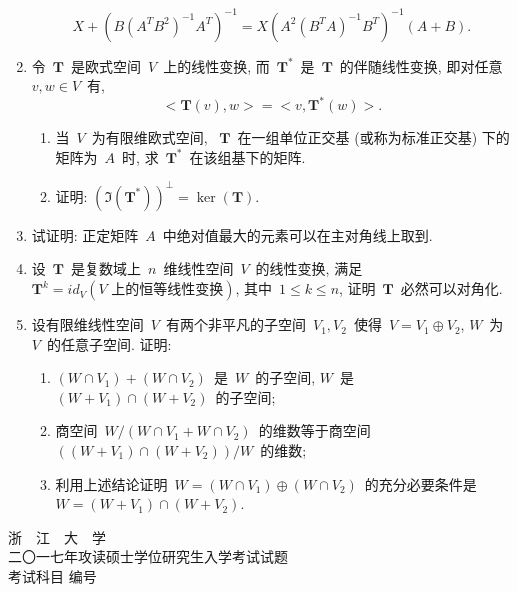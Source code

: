 \documentclass[UTF8,a4paper,11pt]{article}
\begin{document}
\begin{enumerate}
	      \[X+(B(A^{T}B^2)^{-1}A^{T})^{-1}=X(A^2(B^{T}A)^{-1}B^{T})^{-1}(A+B).\]
	      \vspace{2em}
	\item 令~$\mathbf{T}$~是欧式空间~$V$~上的线性变换, 而~$\mathbf{T}^{*}$~是~$\mathbf{T}$~的伴随线性变换, 即对任意~$v,w\in V$~有,
	      \[<\mathbf{T}(v),w>=<v,\mathbf{T}^{*}(w)>.\]
	      \begin{enumerate}
		      \item 当~$V$~为有限维欧式空间, ~$\mathbf{T}$~在一组单位正交基 (或称为标准正交基) 下的矩阵为~$A$~时, 求~$\mathbf{T}^{*}$~在该组基下的矩阵.
		      \item 证明: $(\Im(\mathbf{T}^{*}))^{\perp}=\ker(\mathbf{T})$.
	      \end{enumerate}
	      \vspace{2em}
	\item 试证明: 正定矩阵~$A$~中绝对值最大的元素可以在主对角线上取到.
	      \vspace{2em}
	\item 设~$\mathbf{T}$~是复数域上~$n$~维线性空间~$V$~的线性变换, 满足~$\mathbf{T}^k=id_{V} (\text{$V$~上的恒等线性变换})$, 其中~$1\leqslant k\leqslant n$, 证明~$\mathbf{T}$~必然可以对角化.
	      \vspace{2em}
	\item 设有限维线性空间~$V$~有两个非平凡的子空间~$V_1,V_2$~使得~$V=V_1\oplus V_2$, $W$~为~$V$~的任意子空间. 证明:
	      \begin{enumerate}
		      \item $(W\cap V_1)+(W\cap V_2)$~是~$W$~的子空间, $W$~是~$(W+V_1)\cap(W+V_2)$~的子空间;
		      \item 商空间~$W/(W\cap V_1+W\cap V_2)$~的维数等于商空间~$((W+V_1)\cap(W+V_2))/W$~的维数;
		      \item 利用上述结论证明~$W=(W\cap V_1)\oplus(W\cap V_2)$~的充分必要条件是~$W=(W+V_1)\cap(W+V_2)$.
	      \end{enumerate}
	      \vspace{2em}
\end{enumerate}

\newpage
\setcounter{page}{1}

\begin{center}
	{\Huge 浙~~江~~大~~学}\\
	\setlength{\parskip}{5pt}
	{\Large 二〇一七年攻读硕士学位研究生入学考试试题}\\
	\setlength{\parskip}{10 pt}
	{\Large 考试科目\underline{} 编号\underline{}}
\end{center}
\end{document}
